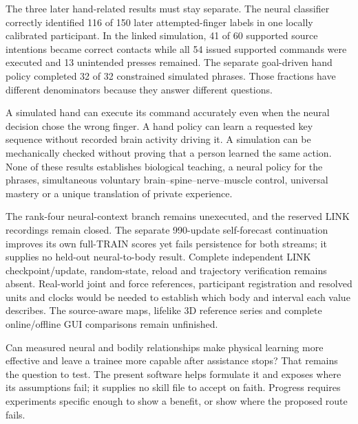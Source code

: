 The three later hand-related results must stay separate. The neural classifier
correctly identified 116 of 150 later attempted-finger labels in one locally
calibrated participant. In the linked simulation, 41 of 60 supported source
intentions became correct contacts while all 54 issued supported commands were
executed and 13 unintended presses remained. The separate goal-driven hand
policy completed 32 of 32 constrained simulated phrases. Those fractions have
different denominators because they answer different questions.

A simulated hand can execute its command accurately even when the neural
decision chose the wrong finger. A hand policy can learn a requested key
sequence without recorded brain activity driving it. A simulation can be
mechanically checked without proving that a person learned the same action.
None of these results establishes biological teaching, a neural policy for the
phrases, simultaneous voluntary brain--spine--nerve--muscle control, universal
mastery or a unique translation of private experience.

The rank-four neural-context branch remains unexecuted, and the reserved LINK recordings remain closed. The separate 990-update self-forecast continuation improves its own full-TRAIN scores yet fails persistence for both streams; it supplies no held-out neural-to-body result. Complete independent LINK checkpoint/update, random-state, reload and trajectory verification remains absent. Real-world joint and force references, participant registration and resolved units and clocks would be needed to establish which body and interval each value describes. The source-aware maps, lifelike 3D reference series and complete online/offline GUI comparisons remain unfinished.

Can measured neural and bodily relationships make physical learning more
effective and leave a trainee more capable after assistance stops? That remains
the question to test. The present software helps formulate it and exposes where
its assumptions fail; it supplies no skill file to accept on faith. Progress
requires experiments specific enough to show a benefit, or show where the
proposed route fails.

